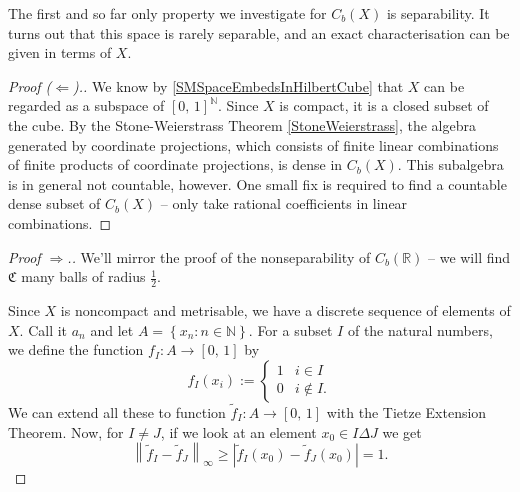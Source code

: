 The first and so far only property we investigate for \( C_b(X) \) is separability. It turns out that this space is rarely separable, and an exact characterisation can be given in terms of \( X \).


\begin{proof}[Proof (\(\Leftarrow\)).]
    We know by \ref{SMSpaceEmbedsInHilbertCube} that \( X \) can be regarded as a subspace of \( [0,\,1]^{ \mathbb{N} } \). Since \( X \) is compact, it is a closed subset of the cube. By the Stone-Weierstrass Theorem \ref{StoneWeierstrass}, the algebra generated by coordinate projections, which consists of finite linear combinations of finite products of coordinate projections, is dense in \( C_b(X). \)
    This subalgebra is in general not countable, however. One small fix is required to find a countable dense subset of \( C_b(X) \) -- only take rational coefficients in linear combinations.
\end{proof}

\begin{proof}[Proof \(\Rightarrow\).]

We'll mirror the proof of the nonseparability of \( C_b( \mathbb{R} ) \) -- we will find \( \mathfrak{C} \) many balls of radius \( \frac{1}{2} \).

Since \( X \) is noncompact and metrisable, we have a discrete sequence of elements of \( X \). Call it \( a_n \) and let \( A = \left\{ x_n : n \in \mathbb{N} \right\} \). For a subset \( I  \) of the natural numbers, we define the function \( f_I: A \to [0,\,1] \) by
\[ 
    f_I (x_i) := \begin{cases}
        1 &i \in I \\
        0 &i \not\in I.
    \end{cases}
\]
We can extend all these to function \( \widetilde{f}_I: A \to [0,\,1] \) with the Tietze Extension Theorem. %
Now, for \( I \neq J \), if we look at an element \( x_0 \in I \Delta J\) we get
\[ 
    \left \| \widetilde{f}_I - \widetilde{f}_J \right\|_\infty \geqslant \left| \widetilde{f}_I(x_0) - \widetilde{f}_J(x_0) \right| = 1. 
\]
\end{proof}

